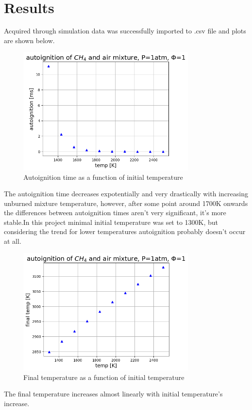 \documentclass[a4paper]{article}
\begin{document}
\section{Results}
Acquired through simulation data was successfully imported to .csv file and plots are shown below.

\begin{figure}[H]
\centering
\includegraphics[width=0.8\textwidth]{autoignition_initialtemperature.png}
\caption{Autoignition time as a function of initial temperature}
\end{figure}
The autoignition time decreases expotentially and very drastically with increasing unburned mixture temperature, however, after some point around 1700K onwards the differences between autoignition times aren't very significant, it's more stable.In this project minimal initial temperature was set to 1300K, but considering the trend for lower temperatures autoignition probably doesn't occur at all.

\begin{figure}[H]
\centering
\includegraphics[width=0.8\textwidth]{finaltemp_temp.png}
\caption{Final temperature as a function of initial temperature}
\end{figure}
\newpage
The final temperature increases almost linearly with initial temperature's increase.
\end{document}
